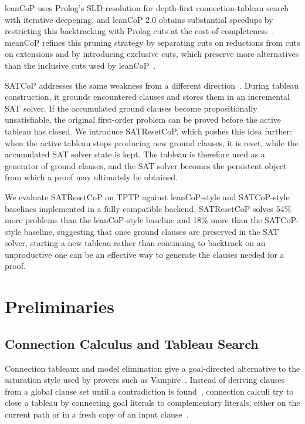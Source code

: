 \documentclass{EasyChair3.5/easychair}
\newcommand{\cop}[1]{\textsf{#1}}
\begin{document}
\cop{leanCoP} uses Prolog's SLD resolution for depth-first connection-tableau search with iterative deepening, and \cop{leanCoP 2.0} obtains substantial speedups by restricting this backtracking with Prolog cuts at the cost of completeness~\cite{leancopcut}.
\cop{meanCoP} refines this pruning strategy by separating cuts on reductions from cuts on extensions and by introducing exclusive cuts, which preserve more alternatives than the inclusive cuts used by \cop{leanCoP}~\cite{meancop}.

\cop{SATCoP} addresses the same weakness from a different direction~\cite{satcop}.
During tableau construction, it grounds encountered clauses and stores them in an incremental SAT solver.
If the accumulated ground clauses become propositionally unsatisfiable, the original first-order problem can be proved before the active tableau has closed.
We introduce \cop{SATResetCoP}, which pushes this idea further: when the active tableau stops producing new ground clauses, it is reset, while the accumulated SAT solver state is kept.
The tableau is therefore used as a generator of ground clauses, and the SAT solver becomes the persistent object from which a proof may ultimately be obtained.

We evaluate \cop{SATResetCoP} on TPTP against \cop{leanCoP}-style and \cop{SATCoP}-style baselines implemented in a fully compatible backend.
\cop{SATResetCoP} solves 54\% more problems than the \cop{leanCoP}-style baseline and 18\% more than the \cop{SATCoP}-style baseline, suggesting that once ground clauses are preserved in the SAT solver, starting a new tableau rather than continuing to backtrack on an unproductive one can be an effective way to generate the clauses needed for a proof.

\section{Preliminaries}

\subsection{Connection Calculus and Tableau Search}

Connection tableaux and model elimination give a goal-directed alternative to the saturation style used by provers such as \cop{Vampire}~\cite{riazanovDesignImplementationVAMPIRE2002}.
Instead of deriving clauses from a global clause set until a contradiction is found~\cite{bachmairResolutionTheoremProving2001,schulzPerformanceClauseSelection2016}, connection calculi try to close a tableau by connecting goal literals to complementary literals, either on the current path or in a fresh copy of an input clause~\cite{connectiontableaux,ottenAdvancesConnectionBasedAutomated2017}.
\end{document}
